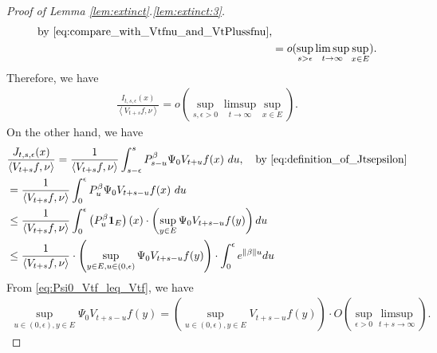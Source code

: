\documentclass[12pt,a4paper]{amsart}
\numberwithin{equation}{section}
\theoremstyle{plain}
\theoremstyle{definition}
\begin{document}
\begin{proof}[Proof of Lemma \ref{lem:extinct}.\eqref{lem:extinct:3}]
\begin{align}
\quad\text{by~\eqref{eq:compare_with_Vtfnu_and_VtPlussfnu},}
\\&= o(\sup_{s>\epsilon}\limsup_{t\to \infty} \sup_{x\in E}) .
\end{align}
Therefore, we have
\begin{align}
  \frac{I_{t,s,\epsilon}(x)}{\left\langle V_{t+s}f,\nu \right\rangle} 
= o(\sup_{s, \epsilon >0} \limsup_{t\to \infty}\sup_{x\in E}).
  \label{eq:10}
\end{align}
On the other hand, we have
\begin{align}
& \frac{J_{t,s,\epsilon}(x)}{\left\langle V_{t+s}f,\nu \right\rangle} 
= \frac{1}{\left\langle V_{t+s}f,\nu \right\rangle}\int_{s-\epsilon}^s P_{s-u}^\beta \Psi_0 V_{t+u}f (x)~du ,\quad\text{by~\eqref{eq:definition_of_Jtsepsilon}}
\\&= \frac{1}{\left\langle V_{t+s}f,\nu \right\rangle} \int_0^\epsilon P_u^\beta \Psi_0 V_{t+s-u}f(x)~du
  \\ & \leq  \frac{1}{\left\langle V_{t+s}f,\nu \right\rangle} \int_0^\epsilon \left(P_u^\beta \mathbf 1_E\right)(x) \cdot \left( \sup_{y\in E} \Psi_0 V_{t+s - u} f(y) \right) du
  \\ & \leq  \frac{1}{\left\langle V_{t+s}f,\nu \right\rangle}\cdot \left( \sup_{y \in E, u \in (0, \epsilon)}\Psi_0 V_{t+s - u} f(y) \right) \cdot \int_0^\epsilon e^{\|\beta\|u}du 
\end{align}
From \eqref{eq:Psi0_Vtf_leq_Vtf}, we have
\begin{align}
  \sup_{u \in (0,\epsilon),y\in E}\Psi_0 V_{t+s-u}f(y) = \left(\sup_{u \in (0,\epsilon), y\in E} V_{t+s-u}f(y) \right)\cdot O(\sup_{\epsilon > 0}\limsup_{t+s\to \infty} ).
\end{align}


\end{proof}
\end{document}
